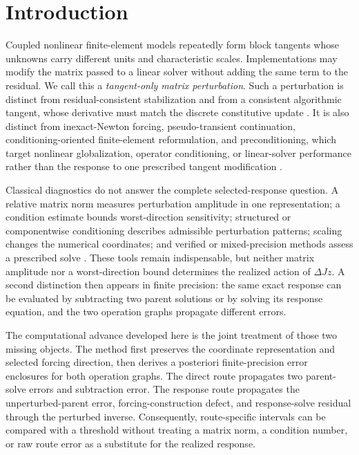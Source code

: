 \documentclass[preprint,12pt]{elsarticle}
\theoremstyle{definition}
\begin{document}
\section{Introduction}

Coupled nonlinear finite-element models repeatedly form block tangents whose unknowns carry different units and characteristic scales. Implementations may modify the matrix passed to a linear solver without adding the same term to the residual. We call this a \emph{tangent-only matrix perturbation}. Such a perturbation is distinct from residual-consistent stabilization and from a consistent algorithmic tangent, whose derivative must match the discrete constitutive update \cite{S32}. It is also distinct from inexact-Newton forcing, pseudo-transient continuation, conditioning-oriented finite-element reformulation, and preconditioning, which target nonlinear globalization, operator conditioning, or linear-solver performance rather than the response to one prescribed tangent modification \cite{S21,S29,S30,S31,S33,S34,S36}.

Classical diagnostics do not answer the complete selected-response question. A relative matrix norm measures perturbation amplitude in one representation; a condition estimate bounds worst-direction sensitivity; structured or componentwise conditioning describes admissible perturbation patterns; scaling changes the numerical coordinates; and verified or mixed-precision methods assess a prescribed solve \cite{S01,S02,S03,S05,S06,S07,S08,S11,S12,S13,S26,S28,S35,S37,S38,S39,S40,S41,S42,S43}. These tools remain indispensable, but neither matrix amplitude nor a worst-direction bound determines the realized action of $\Delta Jz$. A second distinction then appears in finite precision: the same exact response can be evaluated by subtracting two parent solutions or by solving its response equation, and the two operation graphs propagate different errors.

The computational advance developed here is the joint treatment of those two missing objects. The method first preserves the coordinate representation and selected forcing direction, then derives a posteriori finite-precision error enclosures for both operation graphs. The direct route propagates two parent-solve errors and subtraction error. The response route propagates the unperturbed-parent error, forcing-construction defect, and response-solve residual through the perturbed inverse. Consequently, route-specific intervals can be compared with a threshold without treating a matrix norm, a condition number, or raw route error as a substitute for the realized response.
\end{document}
